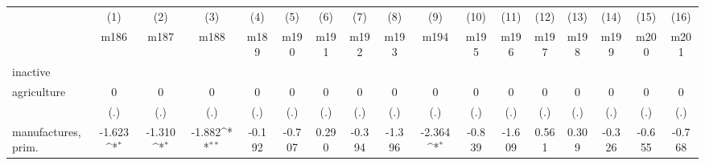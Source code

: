 {
\def\sym#1{\ifmmode^{#1}\else\(^{#1}\)\fi}
\begin{tabular}{l*{16}{c}}
\hline\hline
                    &\multicolumn{1}{c}{(1)}&\multicolumn{1}{c}{(2)}&\multicolumn{1}{c}{(3)}&\multicolumn{1}{c}{(4)}&\multicolumn{1}{c}{(5)}&\multicolumn{1}{c}{(6)}&\multicolumn{1}{c}{(7)}&\multicolumn{1}{c}{(8)}&\multicolumn{1}{c}{(9)}&\multicolumn{1}{c}{(10)}&\multicolumn{1}{c}{(11)}&\multicolumn{1}{c}{(12)}&\multicolumn{1}{c}{(13)}&\multicolumn{1}{c}{(14)}&\multicolumn{1}{c}{(15)}&\multicolumn{1}{c}{(16)}\\
                    &\multicolumn{1}{c}{m186}&\multicolumn{1}{c}{m187}&\multicolumn{1}{c}{m188}&\multicolumn{1}{c}{m189}&\multicolumn{1}{c}{m190}&\multicolumn{1}{c}{m191}&\multicolumn{1}{c}{m192}&\multicolumn{1}{c}{m193}&\multicolumn{1}{c}{m194}&\multicolumn{1}{c}{m195}&\multicolumn{1}{c}{m196}&\multicolumn{1}{c}{m197}&\multicolumn{1}{c}{m198}&\multicolumn{1}{c}{m199}&\multicolumn{1}{c}{m200}&\multicolumn{1}{c}{m201}\\
\hline
inactive            &                     &                     &                     &                     &                     &                     &                     &                     &                     &                     &                     &                     &                     &                     &                     &                     \\
agriculture         &           0         &           0         &           0         &           0         &           0         &           0         &           0         &           0         &           0         &           0         &           0         &           0         &           0         &           0         &           0         &           0         \\
                    &         (.)         &         (.)         &         (.)         &         (.)         &         (.)         &         (.)         &         (.)         &         (.)         &         (.)         &         (.)         &         (.)         &         (.)         &         (.)         &         (.)         &         (.)         &         (.)         \\
[1em]
manufactures, prim. &      -1.623\sym{*}  &      -1.310\sym{*}  &      -1.882\sym{**} &      -0.192         &      -0.707         &       0.290         &      -0.394         &      -1.396         &      -2.364\sym{*}  &      -0.839         &      -1.609         &       0.561         &       0.309         &      -0.326         &      -0.655         &      -0.768         \\

\end{tabular}}

